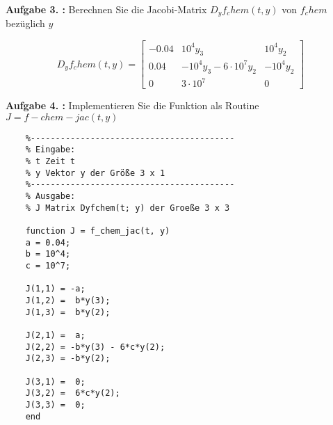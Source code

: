 \begin{mybox}
	\textbf{Aufgabe 3. :}	Berechnen Sie die Jacobi-Matrix $ D_yf_chem(t,y) $ von $ f_chem $ bezüglich $ y $
\end{mybox} 

\begin{equation}
	D_yf_chem(t,y) =
\begin{bmatrix}
	-0.04 & 10^4y_3 & 10^4y_2 \\
	0.04 & -10^4y_3-6\cdot 10^7y_2 & -10^4y_2 \\
	0 & 3\cdot 10^7 & 0 
\end{bmatrix}
\end{equation}

\begin{mybox}
	\textbf{Aufgabe 4. :}	Implementieren Sie die Funktion als Routine $ J = f-chem-jac(t,y) $
\end{mybox}
 
\begin{lstlisting}[style=Matlab-editor]
	% J=f_chem_jac(t,y)
	%-----------------------------------------
	% Eingabe:
	% t Zeit t
	% y Vektor y der Größe 3 x 1
	%-----------------------------------------
	% Ausgabe:
	% J Matrix Dyfchem(t; y) der Groeße 3 x 3

	function J = f_chem_jac(t, y)
	a = 0.04;
	b = 10^4;
	c = 10^7;

	J(1,1) = -a;
	J(1,2) =  b*y(3); 
	J(1,3) =  b*y(2);

	J(2,1) =  a;
	J(2,2) = -b*y(3) - 6*c*y(2);
	J(2,3) = -b*y(2);

	J(3,1) =  0;
	J(3,2) =  6*c*y(2);
	J(3,3) =  0;
	end
\end{lstlisting}

